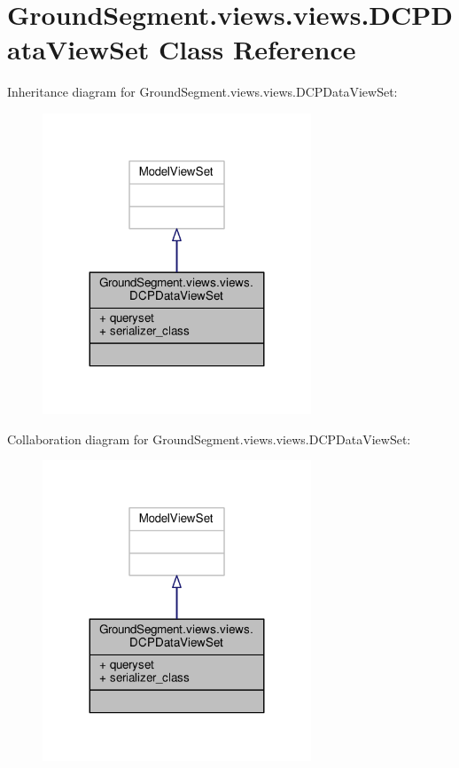 \hypertarget{class_ground_segment_1_1views_1_1views_1_1_d_c_p_data_view_set}{}\section{Ground\+Segment.\+views.\+views.\+D\+C\+P\+Data\+View\+Set Class Reference}
\label{class_ground_segment_1_1views_1_1views_1_1_d_c_p_data_view_set}


Inheritance diagram for Ground\+Segment.\+views.\+views.\+D\+C\+P\+Data\+View\+Set\+:\nopagebreak
\begin{figure}[H]
\begin{center}
\leavevmode
\includegraphics[width=227pt]{class_ground_segment_1_1views_1_1views_1_1_d_c_p_data_view_set__inherit__graph}
\end{center}
\end{figure}


Collaboration diagram for Ground\+Segment.\+views.\+views.\+D\+C\+P\+Data\+View\+Set\+:\nopagebreak
\begin{figure}[H]
\begin{center}
\leavevmode
\includegraphics[width=227pt]{class_ground_segment_1_1views_1_1views_1_1_d_c_p_data_view_set__coll__graph}
\end{center}
\end{figure}
